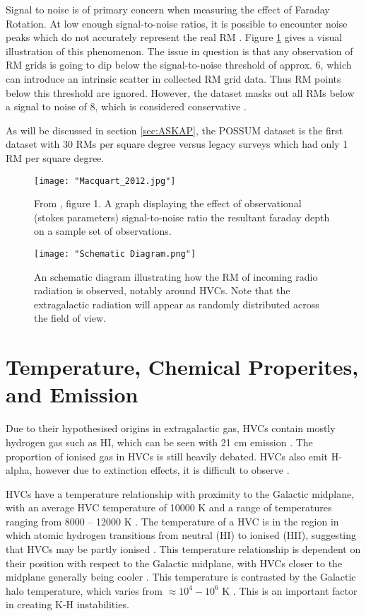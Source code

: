 Signal to noise is of primary concern when measuring the effect of Faraday Rotation. At low enough signal-to-noise ratios, it is possible to encounter noise peaks which do not accurately represent the real RM \citep{ID60}. Figure \ref{fig:snr} gives a visual illustration of this phenomenon. The issue in question is that any observation of RM grids is going to dip below the signal-to-noise threshold of approx. 6, which can introduce an intrinsic scatter in collected RM grid data. Thus RM points below this threshold are ignored. However, the dataset masks out all RMs below a signal to noise of 8, which is considered conservative \citep{ID71}.

As will be discussed in section \ref{sec:ASKAP}, the POSSUM dataset is the first dataset with 30 RMs per square degree versus legacy surveys which had only 1 RM per square degree.

\begin{figure}
    \texttt{[image: "Macquart\_2012.jpg"]}
    \centering
    \caption{From \cite{ID60}, figure 1. A graph displaying the effect of observational (stokes parameters) signal-to-noise ratio the resultant faraday depth on a sample set of observations.}
    \label{fig:snr}
\end{figure}

\begin{figure}
    \texttt{[image: "Schematic Diagram.png"]}
    \centering
    \caption{An schematic diagram illustrating how the RM of incoming radio radiation is observed, notably around HVCs. Note that the extragalactic radiation will appear as randomly distributed across the field of view.}
    \label{fig:schema}
\end{figure}

\section{Temperature, Chemical Properites, and Emission}
\label{sec:chem}

Due to their hypothesised origins in extragalactic gas, HVCs contain mostly hydrogen gas such as HI, which can be seen with 21 cm emission \citep{ID7, ID8, ID6}. The proportion of ionised gas in HVCs is still heavily debated. HVCs also emit H-alpha, however due to extinction effects, it is difficult to observe \citep{ID9, ID43}.

HVCs have a temperature relationship with proximity to the Galactic midplane, with an average HVC temperature of 10000 K and a range of temperatures ranging from 8000 – 12000 K \citep{ID49, ID48}. The temperature of a HVC is in the region in which atomic hydrogen transitions from neutral (HI) to ionised (HII), suggesting that HVCs may be partly ionised \citep{ID49, ID48, ID68}. This temperature relationship is dependent on their position with respect to the Galactic midplane, with HVCs closer to the midplane generally being cooler \citep{ID48}. This temperature is contrasted by the Galactic halo temperature, which varies from $\approx 10^4-10^6$ K \citep{ID19}. This is an important factor in creating K-H instabilities.


